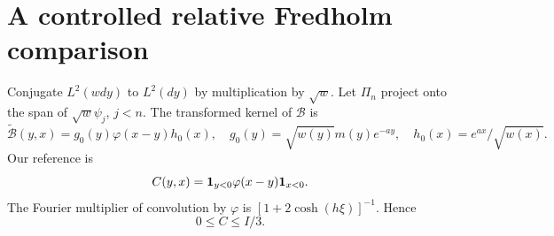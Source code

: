 \documentclass[11pt,letterpaper]{article}
\theoremstyle{remark}\newtheorem{remark}[theorem]{Remark}
\begin{document}
\section{A controlled relative Fredholm comparison}
\label{dsasm:log:sec:fredholm}
Conjugate $L^2(wdy)$ to $L^2(dy)$ by multiplication by $\sqrt w$.
Let $\Pi_n$ project onto the span of $\sqrt w\psi_j$, $j<n$.
The transformed kernel of $\mathcal B$ is
\begin{equation}\label{dsasm:log:Bkernel}
 \widetilde{\mathcal B}(y,x)=g_0(y)\varphi(x-y)h_0(x),\quad
 g_0(y)=\sqrt{w(y)}m(y)e^{-ay},\quad
 h_0(x)=e^{ax}/\sqrt{w(x)}.
\end{equation}
Our reference is
\[
 C(y,x)=\mathbf1_{y<0}\varphi(x-y)\mathbf1_{x<0}.
\]
The Fourier multiplier of convolution by $\varphi$ is
$[1+2\cosh(h\xi)]^{-1}$. Hence
\begin{equation}\label{dsasm:log:Corder}
 0\le C\le I/3.
\end{equation}
\end{document}
